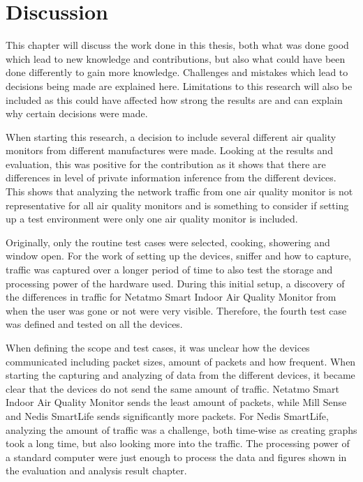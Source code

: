 \chapter{Discussion}
This chapter will discuss the work done in this thesis, both what was done good which lead to new knowledge and contributions, but also what could have been done differently to gain more knowledge. Challenges and mistakes which lead to decisions being made are explained here. Limitations to this research will also be included as this could have affected how strong the results are and can explain why certain decisions were made. 

When starting this research, a decision to include several different air quality monitors from different manufactures were made. Looking at the results and evaluation, this was positive for the contribution as it shows that there are differences in level of private information inference from the different devices. This shows that analyzing the network traffic from one air quality monitor is not representative for all air quality monitors and is something to consider if setting up a test environment were only one air quality monitor is included.

Originally, only the routine test cases were selected, cooking, showering and window open. For the work of setting up the devices, sniffer and how to capture, traffic was captured over a longer period of time to also test the storage and processing power of the hardware used. During this initial setup, a discovery of the differences in traffic for Netatmo Smart Indoor Air Quality Monitor from when the user was gone or not were very visible. Therefore, the fourth test case was defined and tested on all the devices. 

When defining the scope and test cases, it was unclear how the devices communicated including packet sizes, amount of packets and how frequent. When starting the capturing and analyzing of data from the different devices, it became clear that the devices do not send the same amount of traffic. Netatmo Smart Indoor Air Quality Monitor sends the least amount of packets, while Mill Sense and Nedis SmartLife sends significantly more packets. For Nedis SmartLife, analyzing the amount of traffic was a challenge, both time-wise as creating graphs took a long time, but also looking more into the traffic. The processing power of a standard computer were just enough to process the data and figures shown in the evaluation and analysis result chapter. 

